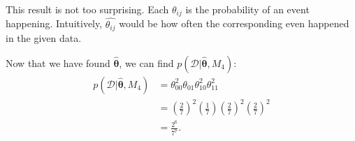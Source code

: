 \documentclass[a4paper,11pt]{article}
\begin{document}
\indent This result is not too surprising. Each $\theta_{ij}$ is the
probability of an event happening.
Intuitively, $\hat{\theta_{ij}}$ would be how often the corresponding even
happened in the given data.

Now that we have found $\hat{\boldsymbol{\theta}}$,
we can find $p(\mathcal{D}|\hat{\boldsymbol{\theta}}, M_4)$:
\begin{align*}
    p(\mathcal{D}|\hat{\boldsymbol{\theta}}, M_4) &=
    \theta_{00}^2\theta_{01}\theta_{10}^2\theta_{11}^2 \\
    &= {\left(\frac{2}{7}\right)}^2
       \left(\frac{1}{7}\right)
       {\left(\frac{2}{7}\right)}^2
       {\left(\frac{2}{7}\right)}^2 \\
    &= \frac{2^6}{7^7}.
\end{align*}
\end{document}
